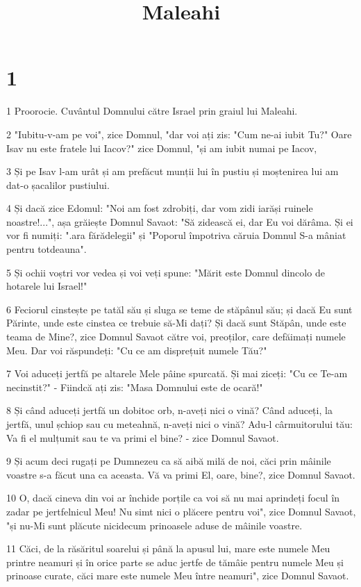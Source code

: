 

\title{Maleahi}


\chapter{1}

\par 1 Proorocie. Cuvântul Domnului către Israel prin graiul lui Maleahi.
\par 2 "Iubitu-v-am pe voi", zice Domnul, "dar voi ați zis: "Cum ne-ai iubit Tu?" Oare Isav nu este fratele lui Iacov?" zice Domnul, "și am iubit numai pe Iacov,
\par 3 Și pe Isav l-am urât și am prefăcut munții lui în pustiu și moștenirea lui am dat-o șacalilor pustiului.
\par 4 Și dacă zice Edomul: "Noi am fost zdrobiți, dar vom zidi iarăși ruinele noastre!...", așa grăiește Domnul Savaot: "Să zidească ei, dar Eu voi dărâma. Și ei vor fi numiți: ".ara fărădelegii" și "Poporul împotriva căruia Domnul S-a mâniat pentru totdeauna".
\par 5 Și ochii voștri vor vedea și voi veți spune: "Mărit este Domnul dincolo de hotarele lui Israel!"
\par 6 Feciorul cinstește pe tatăl său și sluga se teme de stăpânul său; și dacă Eu sunt Părinte, unde este cinstea ce trebuie să-Mi dați? Și dacă sunt Stăpân, unde este teama de Mine?, zice Domnul Savaot către voi, preoților, care defăimați numele Meu. Dar voi răspundeți: "Cu ce am disprețuit numele Tău?"
\par 7 Voi aduceți jertfă pe altarele Mele pâine spurcată. Și mai ziceți: "Cu ce Te-am necinstit?" - Fiindcă ați zis: "Masa Domnului este de ocară!"
\par 8 Și când aduceți jertfă un dobitoc orb, n-aveți nici o vină? Când aduceți, la jertfă, unul șchiop sau cu meteahnă, n-aveți nici o vină? Adu-l cârmuitorului tău: Va fi el mulțumit sau te va primi el bine? - zice Domnul Savaot.
\par 9 Și acum deci rugați pe Dumnezeu ca să aibă milă de noi, căci prin mâinile voastre s-a făcut una ca aceasta. Vă va primi El, oare, bine?, zice Domnul Savaot.
\par 10 O, dacă cineva din voi ar închide porțile ca voi să nu mai aprindeți focul în zadar pe jertfelnicul Meu! Nu simt nici o plăcere pentru voi", zice Domnul Savaot, "și nu-Mi sunt plăcute nicidecum prinoasele aduse de mâinile voastre.
\par 11 Căci, de la răsăritul soarelui și până la apusul lui, mare este numele Meu printre neamuri și în orice parte se aduc jertfe de tămâie pentru numele Meu și prinoase curate, căci mare este numele Meu între neamuri", zice Domnul Savaot.
